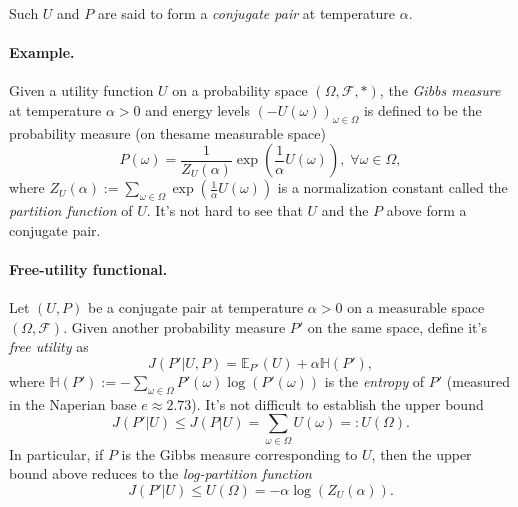 \documentclass{article} %
\begin{document}
Such $U$ and $P$ are said to form a \textit{conjugate pair} at temperature $\alpha$.


\paragraph{Example.}
Given a utility function $U$ on a probability space $(\Omega, \mathcal F, *)$, the \textit{Gibbs measure} at temperature $\alpha > 0$ and energy levels $(-U(\omega))_{\omega \in \Omega}$ is defined to be the probability measure (on thesame measurable space)
  \begin{equation}
    P(\omega) = \frac{1}{Z_{U}(\alpha)}\exp\left(\frac{1}{\alpha}U(\omega)\right), \; \forall \omega \in \Omega,
  \end{equation}
  where
  $Z_{U}(\alpha) := \sum_{\omega \in \Omega}\exp\left(\frac{1}{\alpha}U(\omega)\right)$ is a normalization constant called the \textit{partition function} of $U$.
  It's not hard to see that $U$ and the $P$ above form a conjugate pair.

  \paragraph{Free-utility functional.}
    Let $(U, P)$ be a conjugate pair at temperature $\alpha > 0$  on a measurable space $(\Omega, \mathcal F)$. Given another probability measure $P'$ on the same space, define it's \textit{free utility} as
    \begin{equation}
      J(P'|U, P) = \mathbb E_{P'}(U) + \alpha \mathbb H(P'),
    \label{eq:free_u}
    \end{equation}
    where $\mathbb H(P') := -\sum_{\omega \in \Omega}P'(\omega)\log(P'(\omega))$ is the \textit{entropy} of $P'$ (measured in the Naperian base $e \approx 2.73$). It's not difficult to establish the upper bound
  \begin{equation}
    J(P'|U) \le J(P|U) = \sum_{\omega \in \Omega}U(\omega) =: U(\Omega).
  \end{equation}
  In particular, if $P$ is the Gibbs measure corresponding to $U$, then the upper bound above reduces to the \textit{log-partition function}
  \begin{equation}
    J(P'|U) \le U(\Omega) = -\alpha \log(Z_{U}(\alpha)).
    \end{equation}
\end{document}
